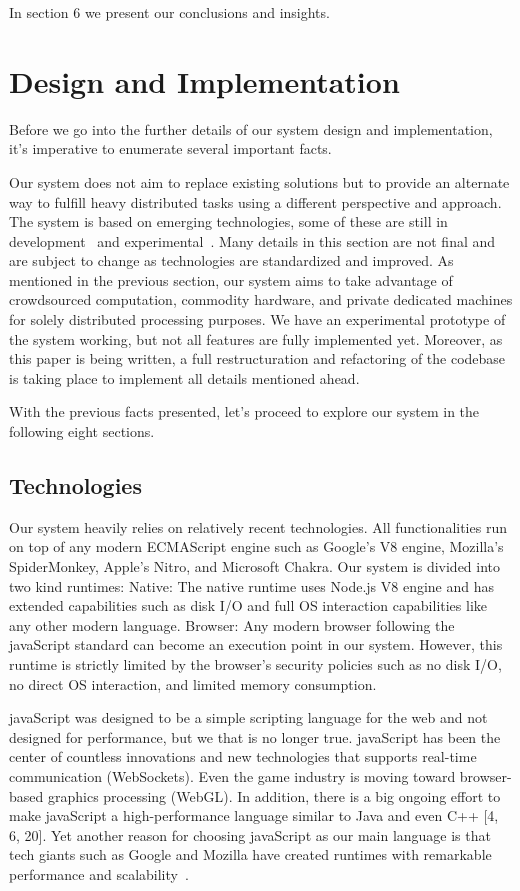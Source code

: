 \documentclass[10pt,reprint]{socc14}
\begin{document}
In section 6 we present our conclusions and insights.


\section{Design and Implementation}

Before we go into the further details of our system design and implementation, it’s imperative to enumerate several important facts.

Our system does not aim to replace existing solutions but to provide an alternate way to fulfill heavy distributed tasks using a different perspective and approach.
The system is based on emerging technologies, some of these are still in development~\cite{Vogt2013} and experimental~\cite{Herhut2013a,MacWilliam2013}. Many details in this section are not final and are subject to change as technologies are standardized and improved.
As mentioned in the previous section, our system aims to take advantage of crowdsourced computation, commodity hardware, and private dedicated machines for solely distributed processing purposes.
We have an experimental prototype of the system working, but not all features are fully implemented yet. Moreover, as this paper is being written, a full restructuration and refactoring of the codebase is taking place to implement all details mentioned ahead.

With the previous facts presented, let’s proceed to explore our system in the following eight sections.


\subsection{Technologies}
Our system heavily relies on relatively recent technologies. All functionalities run on top of any modern ECMAScript engine such as Google’s V8 engine,  Mozilla’s SpiderMonkey, Apple’s Nitro, and Microsoft Chakra. Our system is divided into two kind runtimes: 
Native: The native runtime uses Node.js V8 engine and has extended capabilities such as disk I/O and full OS interaction capabilities like any other modern language.
Browser: Any modern browser following the javaScript standard can become an execution point in our system. However, this runtime is strictly limited by the browser’s security policies such as no disk I/O, no direct OS interaction, and limited memory consumption.

javaScript was designed to be a simple scripting language for the web and not designed for performance, but we that is no longer true. javaScript has been the center of countless innovations and new technologies that supports real-time communication (WebSockets). Even the game industry is moving toward browser-based graphics processing (WebGL). In addition, there is a big ongoing effort to make javaScript a high-performance language similar to Java and even C++ [4, 6, 20]. Yet another reason for choosing javaScript as our main language is that tech giants such as Google and Mozilla have created runtimes with remarkable performance and scalability~\cite{Tilkov2010}.
\end{document}

